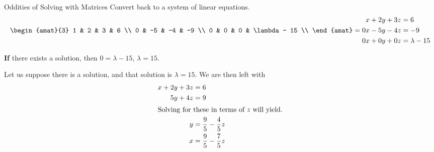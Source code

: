 \begin{example}{Oddities of Solving with Matrices}
  Convert back to a system of linear equations.
  \begin{equation*}
    \begin{amat}{3}
      1 & 2 & 3 & 6 \\
      0 & -5 & -4 & -9 \\
      0 & 0 & 0 & \lambda - 15 \\
    \end{amat}
    =
    \begin{aligned}
      x + 2y + 3z &= 6 \\
      0x - 5y - 4z &= -9 \\
      0x + 0y + 0z &= \lambda - 15 \\
    \end{aligned}
  \end{equation*}

  \textbf{If} there exists a solution, then $0 = \lambda - 15$, $\lambda = 15$.

  Let us suppose there is a solution, and that solution is $\lambda = 15$.
  We are then left with
  \begin{align*}
    x + 2y + 3z &= 6 \\
    5y + 4z &= 9 \\
    \intertext{Solving for these in terms of $z$ will yield.}
    y &= \frac{9}{5} - \frac{4}{5}z \\
    x &= \frac{9}{5} - \frac{7}{5}z
  \end{align*}
\end{example}


